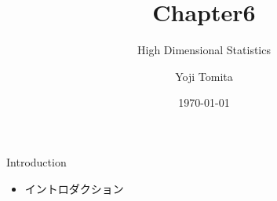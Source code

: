 \documentclass[unicode,aspectratio=169,11pt]{beamer}
\title{Chapter6}
\subtitle{High Dimensional Statistics}
\author{Yoji Tomita}
\date{\today}
\begin{document}
\maketitle

\begin{frame}{Introduction}
    \begin{itemize}
        \item イントロダクション
    \end{itemize}
\end{frame}
\end{document}
